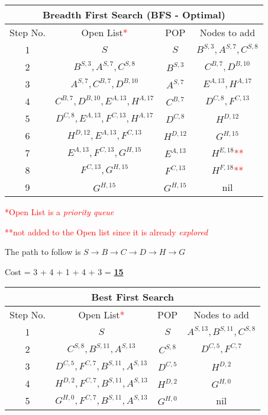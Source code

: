 \documentclass[12pt, letterpaper]{article}
\begin{document}
\begin{center}
    \begin{tabular}{|c|c|c|c|}
    \hline
    \multicolumn{4}{|c|}{Breadth First Search (\textbf{BFS} - Optimal)}\\
    \hline
    Step No. & Open List\textcolor{red}{*} & POP & Nodes to add \\ 
    \hline
    1 & $S$ & $S$ & $B^{S,3}, A^{S,7}, C^{S,8}$\\
    \hline
    2 & $B^{S,3}, A^{S,7}, C^{S,8}$ & $B^{S,3}$ & $C^{B,7},D^{B,10}$ \\
    \hline
    3 & $A^{S,7}, C^{B,7}, D^{B,10}$ & $A^{S,7}$ & $E^{A,13}, H^{A,17}$ \\
    \hline
    4 & $C^{B,7}, D^{B,10}, E^{A,13}, H^{A,17}$ & $C^{B,7}$ & $D^{C,8}, F^{C,13}$\\
    \hline
    5 & $D^{C,8}, E^{A,13}, F^{C,13}, H^{A,17}$ & $D^{C,8}$ & $H^{D,12}$\\
    \hline
    6 & $H^{D,12}, E^{A,13}, F^{C,13}$ & $H^{D,12}$ & $G^{H,15}$\\
    \hline
    7 & $E^{A,13}, F^{C,13}, G^{H,15}$ & $E^{A,13}$ & $H^{E,18}$\textcolor{red}{**}\\
    \hline
    8 & $F^{C,13}, G^{H,15}$ & $F^{C,13}$ & $H^{F,18}$\textcolor{red}{**}\\
    \hline
    9 & $G^{H,15}$ & $G^{H,15}$ & nil\\
    \hline
    \end{tabular}
\end{center}

\textcolor{red}{*Open List is a \textit{priority queue}}

\textcolor{red}{**not added to the Open list since it is already \textit{explored}}

The path to follow is $S\rightarrow B\rightarrow C\rightarrow D\rightarrow H\rightarrow G$

Cost = 3 + 4 + 1 + 4 + 3 = \underline{\textbf{15}}

\begin{center}
    \begin{tabular}{|c|c|c|c|}
    \hline
    \multicolumn{4}{|c|}{Best First Search}\\
    \hline
    Step No. & Open List\textcolor{red}{*} & POP & Nodes to add \\ 
    \hline
    1 & $S$ & $S$ & $A^{S,13}, B^{S,11}, C^{S,8}$ \\
    \hline
    2 & $C^{S,8}, B^{S,11}, A^{S,13}$ & $C^{S,8}$ & $D^{C,5}, F^{C,7}$ \\
    \hline
    3 & $D^{C,5}, F^{C,7}, B^{S,11}, A^{S,13}$ & $D^{C,5}$ & $H^{D,2}$ \\
    \hline
    4 & $H^{D,2}, F^{C,7}, B^{S,11}, A^{S,13}$ & $H^{D,2}$ & $G^{H,0}$\\
    \hline
    5 & $G^{H,0}, F^{C,7}, B^{S,11}, A^{S,13}$ & $G^{H,0}$ & nil\\
    \hline
    \end{tabular}
\end{center}
\end{document}
